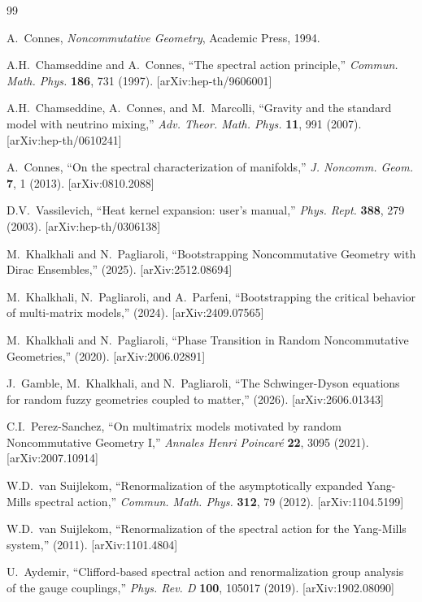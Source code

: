 \documentclass[11pt,a4paper]{article}
\theoremstyle{remark}
\begin{document}
\begin{thebibliography}{99}

 A.~Connes, \textit{Noncommutative Geometry}, Academic Press, 1994.

 A.H.~Chamseddine and A.~Connes, ``The spectral action principle,'' \textit{Commun. Math. Phys.} \textbf{186}, 731 (1997). [arXiv:hep-th/9606001]

 A.H.~Chamseddine, A.~Connes, and M.~Marcolli, ``Gravity and the standard model with neutrino mixing,'' \textit{Adv. Theor. Math. Phys.} \textbf{11}, 991 (2007). [arXiv:hep-th/0610241]

 A.~Connes, ``On the spectral characterization of manifolds,'' \textit{J. Noncomm. Geom.} \textbf{7}, 1 (2013). [arXiv:0810.2088]

 D.V.~Vassilevich, ``Heat kernel expansion: user's manual,'' \textit{Phys. Rept.} \textbf{388}, 279 (2003). [arXiv:hep-th/0306138]

 M.~Khalkhali and N.~Pagliaroli, ``Bootstrapping Noncommutative Geometry with Dirac Ensembles,'' (2025). [arXiv:2512.08694]

 M.~Khalkhali, N.~Pagliaroli, and A.~Parfeni, ``Bootstrapping the critical behavior of multi-matrix models,'' (2024). [arXiv:2409.07565]

 M.~Khalkhali and N.~Pagliaroli, ``Phase Transition in Random Noncommutative Geometries,'' (2020). [arXiv:2006.02891]

 J.~Gamble, M.~Khalkhali, and N.~Pagliaroli, ``The Schwinger-Dyson equations for random fuzzy geometries coupled to matter,'' (2026). [arXiv:2606.01343]

 C.I.~Perez-Sanchez, ``On multimatrix models motivated by random Noncommutative Geometry I,'' \textit{Annales Henri Poincar\'e} \textbf{22}, 3095 (2021). [arXiv:2007.10914]

 W.D.~van Suijlekom, ``Renormalization of the asymptotically expanded Yang-Mills spectral action,'' \textit{Commun. Math. Phys.} \textbf{312}, 79 (2012). [arXiv:1104.5199]

 W.D.~van Suijlekom, ``Renormalization of the spectral action for the Yang-Mills system,'' (2011). [arXiv:1101.4804]

 U.~Aydemir, ``Clifford-based spectral action and renormalization group analysis of the gauge couplings,'' \textit{Phys. Rev. D} \textbf{100}, 105017 (2019). [arXiv:1902.08090]


\end{thebibliography}
\end{document}
